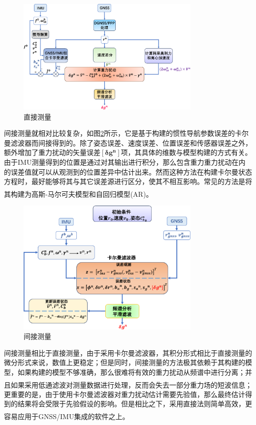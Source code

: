 \documentclass[12pt,a4,utf8]{article}
\newcommand{\upcite}[1]{\textsuperscript{\textsuperscript{\cite{#1}}}} %
\begin{document}
\begin{figure}[h]
      \centering
      \includegraphics[width=0.8\textwidth]{figure/direct-crop.pdf}
      \caption{\label{fig:direct}直接测量}
\end{figure}

间接测量就相对比较复杂，如图\ref{fig:indirect}所示，它是基于构建的惯性导航参数误差的卡尔曼滤波器而间接得到的。除了姿态误差、速度误差、位置误差和传感器误差之外，额外增加了重力扰动的矢量误差$\bm{[\delta g^n]}$项，其具体的维数与模型构建的方式有关。由于IMU测量得到的位置是通过对其输出进行积分，那么包含重力重力扰动在内的误差值就可以从观测到的位置差异中估计出来。然而这种方法在构建卡尔曼状态方程时，最好能够将其与其它误差源进行区分，使其不相互影响。常见的方法是将其构建为高斯-马尔可夫模型\upcite{jekeli1994airborne,jordan1972self}和自回归模型(AR)\upcite{bruton2000improving,nassar2004modeling}。
\begin{figure}[h]
      \centering
      \includegraphics[width=0.8\textwidth]{figure/indirect-crop.pdf}
      \caption{\label{fig:indirect}间接测量}
\end{figure}
间接测量相比于直接测量，由于采用卡尔曼滤波器，其积分形式相比于直接测量的微分形式来说，数值上更稳定；但是同时，间接测量的方法极其依赖于其构建的模型，如果构建的模型不够准确，那么很难将有效的重力扰动从频谱中进行分离；并且如果采用低通滤波对测量数据进行处理，反而会失去一部分重力场的短波信息\upcite{schwarz1997introduction}；更重要的是，由于使用卡尔曼滤波器对重力扰动估计需要先验值，那么最终估计得到的结果将会受限于先验假设的影响。但是相比之下，采用直接法则简单高效，更容易应用于GNSS/IMU集成的软件之上\upcite{jekeli2023inertial}。
\end{document}
